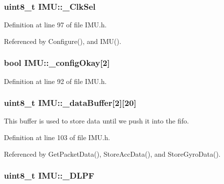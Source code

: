 \hypertarget{class_i_m_u_a4dbeaf17fd1ae9b41b5c3fe61706e5f1}{
\subsubsection[{\_\-ClkSel}]{\setlength{\rightskip}{0pt plus 5cm}uint8\_\-t {\bf IMU::\_\-ClkSel}}}
\label{class_i_m_u_a4dbeaf17fd1ae9b41b5c3fe61706e5f1}


Definition at line 97 of file IMU.h.



Referenced by Configure(), and IMU().

\hypertarget{class_i_m_u_a53aa928d2d68a5287da893bd157e7cbe}{
\subsubsection[{\_\-configOkay}]{\setlength{\rightskip}{0pt plus 5cm}bool {\bf IMU::\_\-configOkay}\mbox{[}2\mbox{]}}}
\label{class_i_m_u_a53aa928d2d68a5287da893bd157e7cbe}


Definition at line 92 of file IMU.h.

\hypertarget{class_i_m_u_ab87a54288295d4d10d605cf6c21d4d0f}{
\subsubsection[{\_\-dataBuffer}]{\setlength{\rightskip}{0pt plus 5cm}uint8\_\-t {\bf IMU::\_\-dataBuffer}\mbox{[}2\mbox{]}\mbox{[}20\mbox{]}}}
\label{class_i_m_u_ab87a54288295d4d10d605cf6c21d4d0f}


This buffer is used to store data until we push it into the fifo. 



Definition at line 103 of file IMU.h.



Referenced by GetPacketData(), StoreAccData(), and StoreGyroData().

\hypertarget{class_i_m_u_a3f9e6159234449cde8f5e72da8acf751}{
\subsubsection[{\_\-DLPF}]{\setlength{\rightskip}{0pt plus 5cm}uint8\_\-t {\bf IMU::\_\-DLPF}}}
\label{class_i_m_u_a3f9e6159234449cde8f5e72da8acf751}


